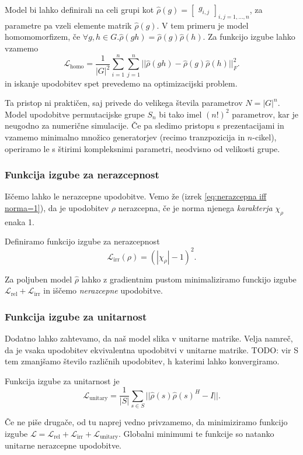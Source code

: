 \documentclass[mat2, tisk]{fmfdelo}
\newcommand{\TODO}[1]{{\color{blue} TODO: #1}}
\newcommand{\loss }{\mathcal L}
\newcommand{\Loss}[1]{\mathcal L _\text{#1}}
\begin{document}
    \begin{opomba}
        Model bi lahko definirali na celi grupi kot $\hat\rho(g)=\begin{bmatrix}
            g_{i,j}
        \end{bmatrix}_{i,j=1,\dotsc, n}$, za parametre pa vzeli elemente matrik $\hat\rho(g)$. V tem primeru je model  homomomorfizem, če $\forall g, h \in G. \hat\rho(gh)=\hat\rho(g) \hat\rho(h)$. Za funkcijo izgube lahko vzamemo
        $$
        \Loss{homo} = \frac{1}{|G|^2}\sum_{i=1}^n \sum_{j=1}^n || \hat\rho(gh)-\hat\rho(g) \hat\rho(h)||_F^2.
        $$
        in iskanje upodobitev spet prevedemo na optimizacijski problem.

        Ta pristop ni praktičen, saj privede do velikega števila parametrov $N=|G|^n$. Model upodobitve permutacijske grupe $S_n$ bi tako imel $(n!)^2$ parametrov, kar je neugodno za numerične simulacije. Če pa sledimo pristopu s prezentacijami in vzamemo minimalno množico generatorjev (recimo tranzpozicija in $n$-cikel), operiramo le s štirimi kompleksnimi parametri, neodvisno od velikosti grupe.
    \end{opomba}
     \subsubsection{Funkcija izgube za nerazcepnost}
     Iščemo lahko le nerazcepne upodobitve. Vemo že (izrek \ref{eq:nerazcepna iff norma=1}), da je upodobitev $\rho$ nerazcepna, če je norma njenega \emph{karakterja} $\chi_\rho$ enaka 1. 

     \begin{definicija}
     Definiramo funkcijo izgube za nerazcepnost
     \begin{equation}
         \label{eq:irr loss}
         \Loss{irr}(\rho) = (|\chi_\rho| - 1)^2.
     \end{equation}    
     \end{definicija}
     Za poljuben model $\hat \rho$ lahko z gradientnim pustom minimaliziramo funckijo izgube $\Loss{rel} + \Loss{irr}$ in iščemo \emph{nerazcepne} upodobitve. 
     \subsubsection{Funkcija izgube za unitarnost}
     Dodatno lahko zahtevamo, da naš model slika v unitarne matrike. Velja namreč, da je vsaka upodobitev ekvivalentna upodobitvi v unitarne matrike. \TODO{vir}
     S tem zmanjšamo število različnih upodobitev, h katerimi lahko konvergiramo. 
     \begin{definicija}
         Funkcija izgube za unitarnost je 
         \begin{equation}
             \label{eq: unitary loss}
             \Loss{unitary} = \frac{1}{|S|} \sum \limits_{s \in S} ||\hat\rho(s) \hat\rho(s)^H - I||.
         \end{equation}
     \end{definicija}
     Če ne piše drugače, od tu naprej vedno privzamemo, da minimiziramo funkcijo izgube $\loss = \Loss{rel} + \Loss{irr} + \Loss{unitary}$. Globalni minimumi te funkcije so natanko unitarne nerazcepne upodobitve.
\end{document}
